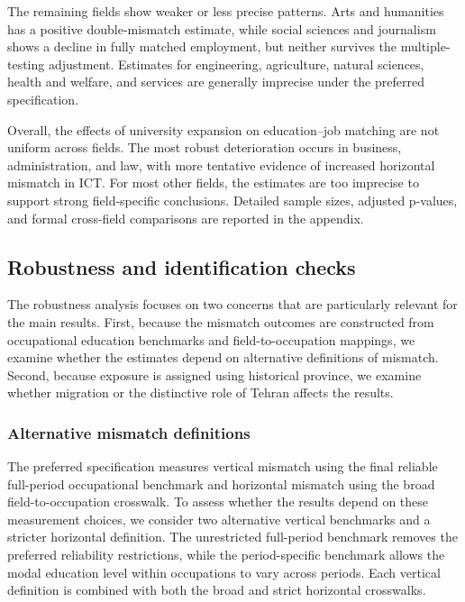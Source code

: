 The remaining fields show weaker or less precise patterns. Arts and humanities has a positive double-mismatch estimate, while social sciences and journalism shows a decline in fully matched employment, but neither survives the multiple-testing adjustment. Estimates for engineering, agriculture, natural sciences, health and welfare, and services are generally imprecise under the preferred specification.

Overall, the effects of university expansion on education--job matching are not uniform across fields. The most robust deterioration occurs in business, administration, and law, with more tentative evidence of increased horizontal mismatch in ICT. For most other fields, the estimates are too imprecise to support strong field-specific conclusions. Detailed sample sizes, adjusted p-values, and formal cross-field comparisons are reported in the appendix.

\subsection{Robustness and identification checks}

The robustness analysis focuses on two concerns that are particularly relevant for the main results. First, because the mismatch outcomes are constructed from occupational education benchmarks and field-to-occupation mappings, we examine whether the estimates depend on alternative definitions of mismatch. Second, because exposure is assigned using historical province, we examine whether migration or the distinctive role of Tehran affects the results.

\subsubsection{Alternative mismatch definitions}

The preferred specification measures vertical mismatch using the final reliable full-period occupational benchmark and horizontal mismatch using the broad field-to-occupation crosswalk. To assess whether the results depend on these measurement choices, we consider two alternative vertical benchmarks and a stricter horizontal definition. The unrestricted full-period benchmark removes the preferred reliability restrictions, while the period-specific benchmark allows the modal education level within occupations to vary across periods. Each vertical definition is combined with both the broad and strict horizontal crosswalks.

